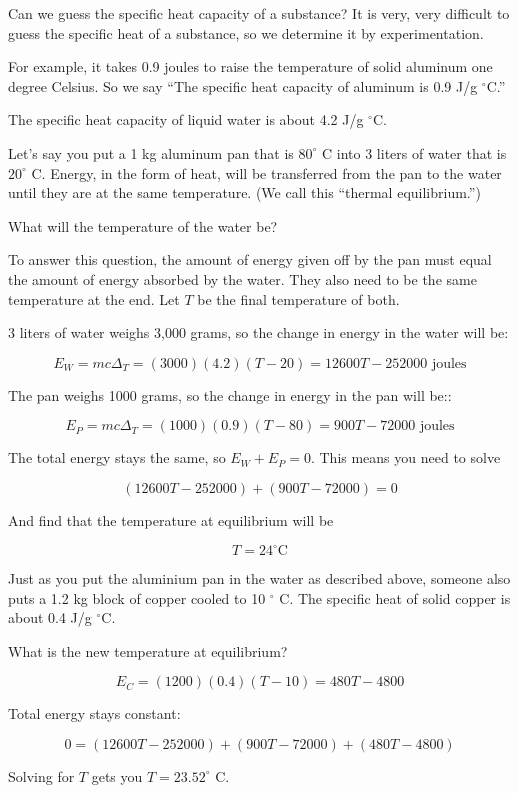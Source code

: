 Can we guess the specific heat capacity of a substance? It is very,
very difficult to guess the specific heat of a substance, so we determine
it by experimentation.

For example, it takes 0.9 joules to raise
the temperature of solid aluminum one degree Celsius. So we say ``The
specific heat capacity of aluminum is 0.9 J/g $^\circ$C.''

The specific heat capacity of liquid water is about 4.2 J/g $^\circ$C.

Let's say you put a 1 kg aluminum pan that is $80^\circ$ C into
3 liters of water that is $20^\circ$ C. Energy, in the form of heat,
will be transferred from the pan to the water until they are at the same
temperature. (We call this ``thermal equilibrium.'')

What will the temperature of the water be?

To answer this question, the amount of energy given off by the
pan must equal the amount of energy absorbed by the water. They also
need to be the same temperature at the end. Let $T$ be the final
temperature of both.

3 liters of water weighs 3,000 grams, so the
change in energy in the water will be:

$$E_W = m c \Delta_T = (3000)(4.2)(T - 20) = 12600T - 252000 \text{ joules}$$

The pan weighs 1000 grams, so the change in energy in the pan will be::

$$E_P = m c \Delta_T = (1000)(0.9)(T - 80) = 900T - 72000 \text{ joules}$$

The total energy stays the same, so $E_W + E_P = 0$. This means you need to solve

$$(12600T - 252000) + (900T - 72000) = 0$$

And find that the temperature at equilibrium will be

$$T = 24^\circ \text{C}$$

\begin{Exercise}[title={Thermal Equilibrium}, label=thermal_equilibrium]

Just as you put the aluminium pan in the water as described above,
someone also puts a 1.2 kg block of copper cooled to 10 $^\circ$ C.
The specific heat of solid copper is about 0.4 J/g $^\circ$C.

What is the new temperature at equilibrium?

\end{Exercise}
\begin{Answer}[ref=thermal_equilibrium]

  $$E_C = (1200)(0.4)(T - 10) = 480T - 4800$$

Total energy stays constant:

$$0 = (12600T - 252000) + (900T - 72000) + (480T - 4800)$$

Solving for $T$ gets you $T = 23.52^\circ$ C.

\end{Answer}


